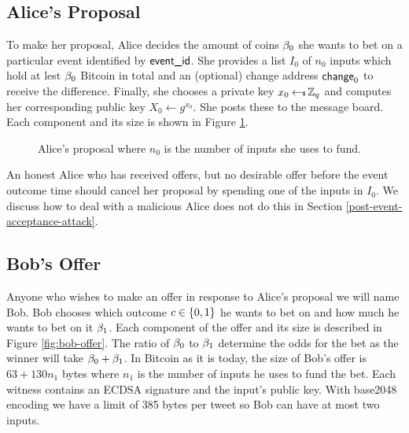 \documentclass[runningheads]{llncs}
\begin{document}
\subsection{Alice's Proposal}

To make her proposal, Alice decides the amount of coins $\beta_0$ she wants to bet on a particular event identified by $\textsf{event\_id}$. She provides a list $I_0$ of $n_0$ inputs which hold at lest $\beta_0$ Bitcoin in total and an (optional) change address $\textsf{change}_0$ to receive the difference. Finally, she chooses a private key $x_0 \hskip2.3pt{\gets\!\!\mbox{\tiny${\$}$\normalsize}}\, \mathbb{Z}_q$ and computes her corresponding public key $X_0 \gets g^{x_0}$. She posts these to the message board. Each component and its size is shown in Figure \ref{fig:alice-proposal}.

\begin{figure}[h!]
  \centering
  \caption{Alice's proposal where $n_0$ is the number of inputs she uses to fund.}
  \label{fig:alice-proposal}
\end{figure}

An honest Alice who has received offers, but no desirable offer before the event outcome time should cancel her proposal by spending one of the inputs in $I_0$. We discuss how to deal with a malicious Alice does not do this in Section
\ref{post-event-acceptance-attack}.



\subsection{Bob's Offer}

Anyone who wishes to make an offer in response to Alice's proposal we will name Bob. Bob chooses which outcome $c \in \{0,1\}$ he wants to bet on and how much he wants to bet on it $\beta_1$. Each component of the offer and its size is described in Figure \ref{fig:bob-offer}. The ratio of $\beta_0$ to $\beta_1$ determine the odds for the bet as the winner will take $\beta_0 + \beta_1$. In Bitcoin as it is today, the size of Bob's offer is $63 + 130n_1$ bytes where $n_1$ is the number of inputs he uses to fund the bet. Each witness contains an ECDSA signature and the input's public key. With base2048 encoding\cite{base2048} we have a limit of 385 bytes per tweet so Bob can have at most two inputs.
\end{document}
